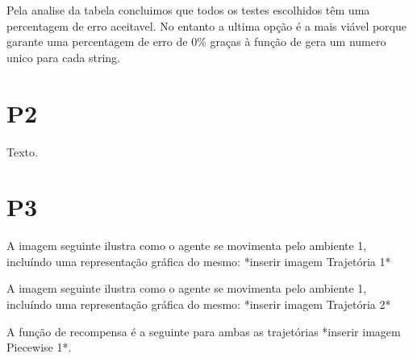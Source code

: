 \documentclass{scrartcl}
\begin{document}
Pela analise da tabela concluimos que todos os testes escolhidos têm uma percentagem de erro aceitavel. No entanto a ultima opção é a mais viável porque garante uma percentagem de erro de 0\% graças à função de gera um numero unico para cada string.


\section*{P2}

Texto.

\section*{P3}

A imagem seguinte ilustra como o agente se movimenta pelo ambiente 1, incluíndo uma representação gráfica do mesmo:
	*inserir imagem Trajetória 1*

A imagem seguinte ilustra como o agente se movimenta pelo ambiente 1, incluíndo uma representação gráfica do mesmo:
	*inserir imagem Trajetória 2*

A função de recompensa é a seguinte para ambas as trajetórias *inserir imagem Piecewise 1*.\par
\end{document}
